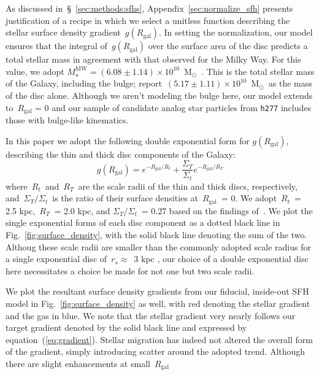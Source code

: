 \documentclass[fleqn, usenatbib]{mnras}
\newcommand{\refp}[1]{(\ref{#1})}
\newcommand{\msun}{\ensuremath{\text{M}_\odot}}
\begin{document}
As discussed in~\S~\ref{sec:methods:sfhs}, Appendix~\ref{sec:normalize_sfh} 
presents justification of a recipe in which we select a unitless function 
describing the stellar surface density gradient~$g(R_\text{gal})$. In setting 
the normalization, our model ensures that the integral of~$g(R_\text{gal})$ 
over the surface area of the disc predicts a total stellar mass in agreement 
with that observed for the Milky Way. For this value, we adopt 
$M_\star^\text{MW} = (6.08 \pm 1.14)\times10^{10}$~\msun~\citep{Licquia2015}. 
This is the total stellar mass of the Galaxy, including the bulge; 
\citet{Licquia2015} report~$(5.17 \pm 1.11)\times10^{10}$~\msun~as the mass of 
the disc alone. Although we aren't modeling the bulge here, our model extends 
to~$R_\text{gal}$ = 0 and our sample of candidate analog star particles from 
\texttt{h277} includes those with bulge-like kinematics. 
\par 
In this paper we adopt the following double exponential form for 
$g(R_\text{gal})$, describing the thin and thick disc components of the 
Galaxy: 
\begin{equation} 
g(R_\text{gal}) = e^{-R_\text{gal}/R_t} + \frac{\Sigma_T}{\Sigma_t} 
e^{-R_\text{gal}/R_T} 
\label{eq:gradient} 
\end{equation} 
where~$R_t$~and~$R_T$~are the scale radii of the thin and thick discs, 
respectively, and~$\Sigma_T/\Sigma_t$~is the ratio of their surface densities 
at~$R_\text{gal}$~= 0. We adopt~$R_t$~= 2.5 kpc,~$R_T$~= 2.0 kpc, and 
$\Sigma_T/\Sigma_t$~= 0.27 based on the findings of~\citet{Bland-Hawthorn2016}. 
We plot the single exponential forms of each disc component as a dotted black 
line in Fig.~\ref{fig:surface_density}, with the solid black line denoting the 
sum of the two. Althoug these scale radii are smaller than the commonly adopted 
scale radius for a single exponential disc of~$r_s \approx$~3 kpc 
\citep[e.g.][]{Binney2008}, our choice of a double exponential disc here 
necessitates a choice be made for not one but two scale radii. 
\par 
We plot the resultant surface density gradients from our fiducial, inside-out 
SFH model in Fig.~\ref{fig:surface_density} as well, with red denoting the 
stellar gradient and the gas in blue. We note that the stellar gradient very 
nearly follows our target gradient denoted by the solid black line and 
expressed by equation~\refp{eq:gradient}. Stellar migration has indeed not 
altered the overall form of the gradient, simply introducing scatter around the 
adopted trend. Although there are slight enhancements at small~$R_\text{gal}$ 
\end{document}
